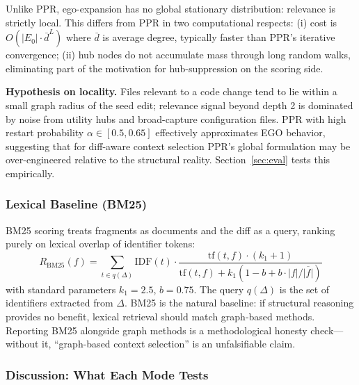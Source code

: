 \documentclass[11pt, a4paper]{article}
\begin{document}
Unlike PPR, ego-expansion has no global stationary distribution: relevance is strictly local. This differs from PPR in two computational respects: (i) cost is $O(|E_0| \cdot \bar{d}^L)$ where $\bar{d}$ is average degree, typically faster than PPR's iterative convergence; (ii) hub nodes do not accumulate mass through long random walks, eliminating part of the motivation for hub-suppression on the scoring side.

\textbf{Hypothesis on locality.} Files relevant to a code change tend to lie within a small graph radius of the seed edit; relevance signal beyond depth 2 is dominated by noise from utility hubs and broad-capture configuration files. PPR with high restart probability $\alpha \in [0.5, 0.65]$ effectively approximates EGO behavior, suggesting that for diff-aware context selection PPR's global formulation may be over-engineered relative to the structural reality. Section~\ref{sec:eval} tests this empirically.

\subsubsection{Lexical Baseline (BM25)}
\label{sec:bm25}

BM25 scoring treats fragments as documents and the diff as a query, ranking purely on lexical overlap of identifier tokens:
\begin{equation}
R_{\mathrm{BM25}}(f) = \sum_{t \in q(\Delta)} \mathrm{IDF}(t) \cdot \frac{\mathrm{tf}(t, f) \cdot (k_1 + 1)}{\mathrm{tf}(t, f) + k_1 (1 - b + b \cdot |f| / \overline{|f|})}
\end{equation}
with standard parameters $k_1 = 2.5$, $b = 0.75$. The query $q(\Delta)$ is the set of identifiers extracted from $\Delta$. BM25 is the natural baseline: if structural reasoning provides no benefit, lexical retrieval should match graph-based methods. Reporting BM25 alongside graph methods is a methodological honesty check---without it, ``graph-based context selection'' is an unfalsifiable claim.

\subsubsection{Discussion: What Each Mode Tests}
\label{sec:scoring-discussion}
\end{document}
